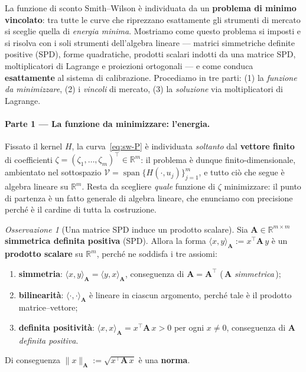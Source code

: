 \documentclass[11pt,a4paper]{article}
\theoremstyle{plain}
\theoremstyle{definition}
\theoremstyle{remark}
\newtheorem*{osservazione}{Osservazione}
\newcommand{\transp}{^{\!\top}}
\begin{document}
La funzione di sconto Smith--Wilson \`e individuata da un \textbf{problema di minimo
vincolato}: tra tutte le curve che riprezzano esattamente gli strumenti di mercato si
sceglie quella di \emph{energia minima}. Mostriamo come questo problema si imposti e si
risolva con i soli strumenti dell'algebra lineare --- matrici simmetriche definite positive
(SPD), forme quadratiche, prodotti scalari indotti da una matrice SPD, moltiplicatori di
Lagrange e proiezioni ortogonali --- e come conduca \textbf{esattamente} al sistema di
calibrazione. Procediamo in tre parti: (1) la \emph{funzione da minimizzare}, (2) i
\emph{vincoli} di mercato, (3) la \emph{soluzione} via moltiplicatori di Lagrange.

\paragraph{Parte 1 --- La funzione da minimizzare: l'energia.}
Fissato il kernel $H$, la curva~\eqref{eq:sw-P} \`e individuata \emph{soltanto} dal
\textbf{vettore finito} di coefficienti $\zeta = (\zeta_1,\dots,\zeta_m)\transp \in
\mathbb{R}^m$: il problema \`e dunque finito-dimensionale, ambientato nel sottospazio
$\mathcal{V} = \operatorname{span}\{H(\cdot,u_j)\}_{j=1}^{m}$, e tutto ci\`o che segue \`e
algebra lineare su $\mathbb{R}^m$. Resta da scegliere \emph{quale} funzione di $\zeta$
minimizzare: il punto di partenza \`e un fatto generale di algebra lineare, che enunciamo con
precisione perch\'e \`e il cardine di tutta la costruzione.

\begin{osservazione}[Una matrice SPD induce un prodotto scalare]
\label{oss:spd-prodotto}
Sia $\mathbf{A}\in\mathbb{R}^{m\times m}$ \textbf{simmetrica definita positiva} (SPD).
Allora la forma $\langle x,y\rangle_{\mathbf{A}} := x\transp \mathbf{A}\, y$ \`e un
\textbf{prodotto scalare} su $\mathbb{R}^m$, perch\'e ne soddisfa i tre assiomi:
\begin{enumerate}
  \item \textbf{simmetria}: $\langle x,y\rangle_{\mathbf{A}} = \langle y,x\rangle_{\mathbf{A}}$,
        conseguenza di $\mathbf{A} = \mathbf{A}\transp$ (\,$\mathbf{A}$ \emph{simmetrica}\,);
  \item \textbf{bilinearit\`a}: $\langle \cdot,\cdot\rangle_{\mathbf{A}}$ \`e lineare in
        ciascun argomento, perch\'e tale \`e il prodotto matrice--vettore;
  \item \textbf{definita positivit\`a}: $\langle x,x\rangle_{\mathbf{A}} = x\transp\mathbf{A}\,x > 0$
        per ogni $x\neq 0$, conseguenza di $\mathbf{A}$ \emph{definita positiva}.
\end{enumerate}
Di conseguenza $\|x\|_{\mathbf{A}} := \sqrt{x\transp \mathbf{A}\, x}$ \`e una \textbf{norma}.
\end{osservazione}
\end{document}
